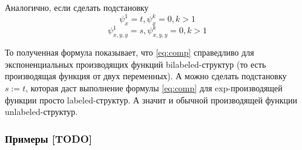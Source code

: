 Аналогично, если сделать подстановку 
$$
\psi_{x}^1 = t, \psi_{x}^k = 0, k>1
$$
$$
\psi_{x,y,y}^1 = s, \psi_{x,y,y}^k = 0, k>1
$$

То полученная формула показывает, что \ref{eq:comp} справедливо для
экспоненциальных производящих функций bilabeled-структур (то есть производящая
функция от двух переменных). А можно сделать подстановку $s := t$, которая
даст выполнение формулы \ref{eq:comp} для exp-производящей функции просто
labeled-структур. А значит и обычной производящей функции unlabeled-структур.

\subsubsection{Примеры [TODO]}
